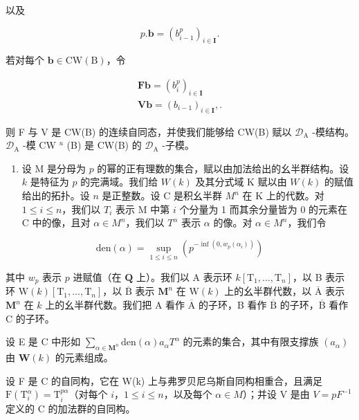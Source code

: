 以及

\[
p. \boldsymbol {b} = (b _ {i - 1} ^ {p}) _ {i \in \mathbf {I}}.
\]

若对每个 \(\pmb{b}\in \mathrm{CW(B)}\)，令

\[
\begin{array}{l} \mathbf {F b} = (b _ {i} ^ {p}) _ {i \in \mathbf {I}} \\ \mathbf {V b} = (b _ {i - 1}) _ {i \in \mathbf {I}},. \end{array}
\]

则 F 与 V 是 CW(B) 的连续自同态，并使我们能够给 CW(B) 赋以 \(\mathcal{D}_{\mathrm{A}}\) -模结构。\(\mathcal{D}_{\mathrm{A}}\) -模 CW \(^u\) (B) 是 CW(B) 的 \(\mathcal{D}_{\mathrm{A}}\) -子模。

\begin{enumerate}
\def\labelenumi{\arabic{enumi})}
\setcounter{enumi}{25}
\tightlist
\item
  设 M 是分母为 \(p\) 的幂的正有理数的集合，赋以由加法给出的幺半群结构。设 \(k\) 是特征为 \(p\) 的完满域。我们给 \(W(k)\) 及其分式域 K 赋以由 \(W(k)\) 的赋值给出的拓扑。设 \(n\) 是正整数。设 C 是积幺半群 \(M^n\) 在 K 上的代数。对 \(1 \leqslant i \leqslant n\)，我们以 \(T_i\) 表示 M 中第 \(i\) 个分量为 1 而其余分量皆为 0 的元素在 C 中的像，且对 \(\alpha \in M^n\)，我们以 \(T^\alpha\) 表示 \(\alpha\) 的像。对 \(\alpha \in M^n\)，我们令
\end{enumerate}

\[
\mathrm{den} (\alpha) = \sup _ {1 \leqslant i \leqslant n} \left(p ^ {- \inf (0, w _ {p} (\alpha_ {i}))}\right)
\]

其中 \(w_p\) 表示 \(p\) 进赋值（在 \(\mathbf{Q}\) 上）。我们以 A 表示环 \(k[\mathrm{T}_1, \ldots, \mathrm{T}_n]\)，以 B 表示环 \(\mathrm{W}(k)[\mathrm{T}_1, \ldots, \mathrm{T}_n]\)，以 \(\overline{\mathrm{B}}\) 表示 \(\mathbf{M}^n\) 在 \(\mathrm{W}(k)\) 上的幺半群代数，以 \(\overline{\mathrm{A}}\) 表示 \(\mathbf{M}^n\) 在 \(k\) 上的幺半群代数。我们把 A 看作 \(\overline{\mathrm{A}}\) 的子环，B 看作 \(\overline{\mathrm{B}}\) 的子环，\(\overline{\mathrm{B}}\) 看作 C 的子环。

设 E 是 C 中形如 \(\sum_{\alpha \in \mathbf{M}^n} \text{den}(\alpha) a_\alpha T^\alpha\) 的元素的集合，其中有限支撑族 \((a_\alpha)\) 由 \(\mathbf{W}(k)\) 的元素组成。

设 F 是 C 的自同构，它在 W(k) 上与弗罗贝尼乌斯自同构相重合，且满足 \(\mathrm{F}(\mathrm{T}_{i}^{\alpha}) = \mathrm{T}_{i}^{p\alpha}\)（对每个 \(i\)，\(1 \leqslant i \leqslant n\)，以及每个 \(\alpha \in M\)）；并设 V 是由 \(V = pF^{-1}\) 定义的 C 的加法群的自同构。

